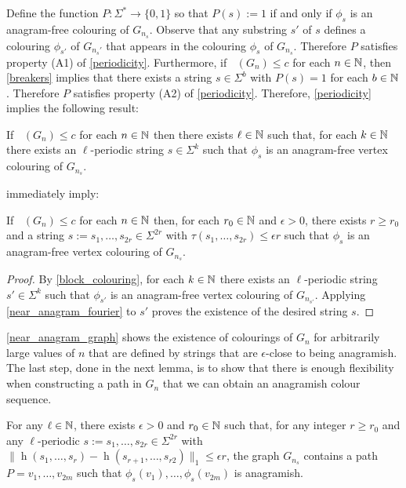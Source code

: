\documentclass{patmorin}
\DeclareMathOperator{\afcn}{\dot{\chi}_\pi}
\DeclareMathOperator{\hist}{h}
\begin{document}
Define the function $P:\Sigma^*\to\{0,1\}$ so that $P(s):=1$ if and only if $\phi_s$ is an anagram-free colouring of $G_{n_s}$.  Observe that any substring $s'$ of $s$ defines a colouring $\phi_{s'}$ of $G_{n_s'}$ that appears in the colouring $\phi_s$ of $G_{n_s}$. Therefore $P$ satisfies property (A1) of \cref{periodicity}.  Furthermore, if $\afcn(G_n)\le c$ for each $n\in\mathbb{N}$, then \cref{breakers} implies that there exists a string $s\in\Sigma^{b}$ with $P(s)=1$ for each $b\in\mathbb{N}$.  Therefore $P$ satisfies property (A2) of \cref{periodicity}.  Therefore, \cref{periodicity} implies the following result:

\begin{lem}\label{block_colouring}
    If $\afcn(G_n)\le c$ for each $n\in\mathbb{N}$ then there exists $\ell\in\mathbb{N}$ such that, for each $k\in\mathbb{N}$ there exists an $\ell$-periodic string $s\in\Sigma^{k}$ such that $\phi_s$ is an anagram-free vertex colouring of $G_{n_s}$.
\end{lem}

 immediately imply:

\begin{lem}\label{near_anagram_graph}
    If $\afcn(G_n)\le c$ for each $n\in\mathbb{N}$ then, for each $r_0\in\mathbb{N}$ and $\epsilon>0$, there exists $r\ge r_0$ and a string $s:=s_1,\ldots,s_{2r}\in\Sigma^{2r}$ with $\tau(s_1,\ldots,s_{2r})\le\epsilon r$ such that $\phi_s$ is an anagram-free vertex colouring of $G_{n_s}$.
\end{lem}

\begin{proof}
    By \cref{block_colouring}, for each $k\in\mathbb{N}$ there exists an $\ell$-periodic string $s'\in\Sigma^k$ such that $\phi_{s'}$ is an anagram-free vertex colouring of $G_{n_{s'}}$. Applying \cref{near_anagram_fourier} to $s'$ proves the existence of the desired string $s$.
\end{proof}

\cref{near_anagram_graph} shows the existence of colourings of $G_n$ for arbitrarily large values of $n$ that are defined by strings that are $\epsilon$-close to being anagramish.  The last step, done in the next lemma, is to show that there is enough flexibility when constructing a path in $G_n$ that we can obtain an anagramish colour sequence.

\begin{lem}\label{anagramish_path}
    For any $\ell\in\mathbb{N}$, there exists $\epsilon>0$ and $r_0\in\mathbb{N}$ such that, for any integer $r\ge r_0$ and any $\ell$-periodic $s:=s_1,\ldots,s_{2r}\in\Sigma^{2r}$ with $\|\hist(s_1,\ldots,s_r)-\hist(s_{r+1},\ldots,s_{r2})\|_1\le\epsilon r$, the graph $G_{n_s}$ contains a path $P=v_1,\ldots,v_{2m}$ such that $\phi_s(v_1),\ldots,\phi_s(v_{2m})$ is anagramish.
\end{lem}
\end{document}
